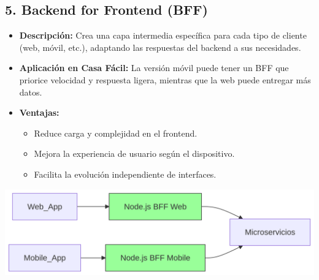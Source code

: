 	\subsection*{5. Backend for Frontend (BFF)}
		\begin{itemize}
			\item \textbf{Descripción:} Crea una capa intermedia específica para cada tipo de cliente (web, móvil, etc.), adaptando las respuestas del backend a sus necesidades.  
			\item \textbf{Aplicación en Casa Fácil:} La versión móvil puede tener un BFF que priorice velocidad y respuesta ligera, mientras que la web puede entregar más datos.  
			\item 	\textbf{Ventajas:}
			\begin{itemize}
				\item Reduce carga y complejidad en el frontend.
				\item Mejora la experiencia de usuario según el dispositivo.
				\item Facilita la evolución independiente de interfaces.
			\end{itemize}
		\end{itemize}
		\begin{center}
			\includegraphics[width=\linewidth]{figures/patterns/BACKEND.png}
			\label{fig:img6}
		\end{center}
	
